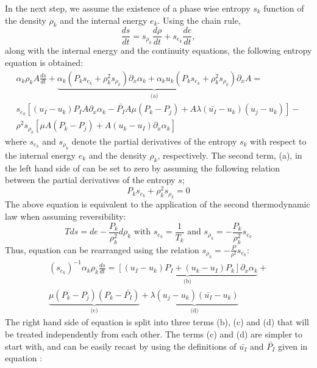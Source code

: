 In the next step, we assume the existence of a phase wise entropy $s_k$ function of the density $\rho_k$ and the internal energy $e_k$. Using the chain rule,
\begin{equation}
\frac{ds}{dt} = s_{\rho_k} \frac{d \rho}{dt} + s_{e_k} \frac{de}{dt},
\end{equation}
along with the internal energy and the continuity equations, the following entropy equation is obtained:
\begin{eqnarray}
\label{eq:ent1}
\alpha_k \rho_k A \frac{ds}{dt} + \underbrace{\alpha_k \left( P_k s_{e_k} + \rho_k^2 s_{\rho_k} \right) \partial_x \alpha_k + \alpha_k u_k \left( P_k s_{e_k} + \rho_k^2 s_{\rho_k} \right) \partial_x A}_\textrm{(a)} = \nonumber\\
s_{e_k} \left[ (u_I-u_k)P_IA \partial_x \alpha_k - \bar{P_I} A \mu (P_k-P_j) + A \lambda (\bar{u_I}-u_k) (u_j-u_k)\right] - \\
\rho^2 s_{\rho_k} \left[ \mu A (P_k-P_j) + A(u_k-u_I) \partial_x \alpha_k\right] \nonumber
\end{eqnarray}
where $s_{e_k}$ and $s_{\rho_k}$ denote the partial derivatives of the entropy $s_k$ with respect to the internal energy $e_k$ and the density $\rho_k$, respectively.
The second term, (a), in the left hand side of  can be set to zero by assuming the following relation between the partial derivatives of the entropy $s$;
\begin{equation}
\label{eq:ent2}
 P_k s_{e_k} + \rho_k^2 s_{\rho_k} = 0
\end{equation} 
The above equation is equivalent to the application of the second thermodynamic law when assuming reversibility:
\begin{equation}
T ds = de - \frac{P_k}{\rho_k^2} d \rho_k \text{ with } s_{e_k} = \frac{1}{T_k} \text{ and } s_{\rho_k} = - \frac{P_k}{\rho_k^2} s_{e_k}
\end{equation}
Thus, equation  can be rearranged using the relation $s_{\rho_k} = - \frac{P}{\rho^2} s_{e_k}$:
\begin{eqnarray}
\label{eq:ent3}
(s_{e_k})^{-1} \alpha_k \rho_k \frac{ds}{dt} = \underbrace{\left[ (u_I-u_k)P_I + (u_k-u_I)P_k \right] \partial_x \alpha_k}_\textrm{(b)} + \nonumber\\ 
\underbrace{\mu (P_k-P_j)(P_k-\bar{P_I})}_\textrm{(c)} + \underbrace{\lambda(u_j-u_k)(\bar{u_I}-u_k)}_\textrm{(d)}
\end{eqnarray}
The right hand side of equation  is split into three terms (b), (c) and (d) that will be treated independently from each other. The terms (c) and (d) are simpler to start with, and can be easily recast by using the definitions of $\bar{u_I}$ and $\bar{P_I}$ given in equation :
